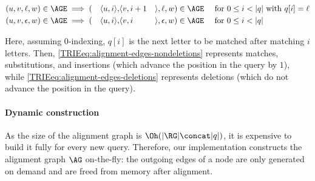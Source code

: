 

\vspace{-1.2em}
{%
\small
\begin{alignat}{10}
	(u,v,\ell,w) &\in \AGE \implies (&\langle u, i \rangle, &\langle v, i+1
		&&\rangle,\ell,w) \in \AGE \quad \text{ for } 0 \leq i < |q| \text{ with }
		q[i]=\ell \label{TRIEeq:alignment-edges-nondeletions} \\
	(u,v,\epsilon,w) &\in\AGE \implies (&\langle u, i \rangle, &\langle v, i
		&&\rangle,\epsilon,w) \in \AGE \quad \text{ for } 0 \leq i < |q| \label{TRIEeq:alignment-edges-deletions}
\end{alignat}
}%

Here, assuming $0$-indexing, $q[i]$ is the next letter to be matched after
matching $i$ letters. Then, \cref{TRIEeq:alignment-edges-nondeletions} represents
matches, substitutions, and insertions (which advance the position in the query
by $1$), while \cref{TRIEeq:alignment-edges-deletions} represents deletions (which do
not advance the position in the query).

\paragraph{Dynamic construction}
As the size of the alignment graph is $\Oh(\lvert \RG \rvert \concat \lvert q
\rvert)$, it is expensive to build it fully for every new query.
Therefore, our implementation constructs the alignment graph $\AG$ on-the-fly:
the outgoing edges of a node are only generated on demand and are freed from
memory after alignment.